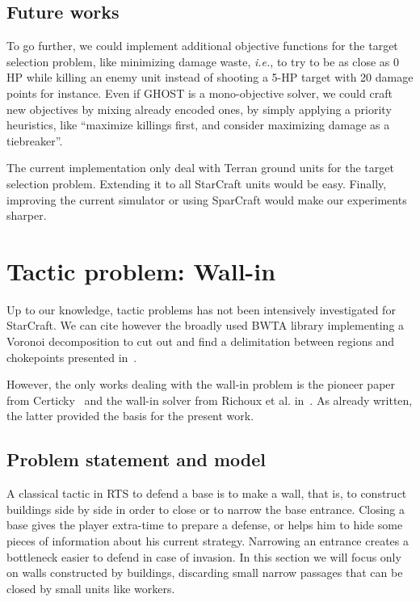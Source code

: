 \documentclass[journal]{IEEEtran}
\newcommand{\ghost}{\textsc{GHOST}\xspace}
\newcommand{\ie}{\textit{i.e.}}
\begin{document}
\subsection{Future works}

To go further,  we could implement additional  objective functions for
the target  selection problem, like  minimizing damage waste,  \ie, to
try to  be as close  as 0  HP while killing  an enemy unit  instead of
shooting a  5-HP target with 20  damage points for instance.   Even if
\ghost is  a mono-objective solver,  we could craft new  objectives by
mixing already encoded ones, by simply applying a priority heuristics,
like ``maximize  killings first, and  consider maximizing damage  as a
tiebreaker''.

The current implementation only deal  with Terran ground units for the
target selection problem.   Extending it to all  StarCraft units would
be easy. Finally,  improving the current simulator  or using SparCraft
would make our experiments sharper.

\section{Tactic problem: Wall-in}\label{sec:wall}

Up  to  our  knowledge,  tactic  problems  has  not  been  intensively
investigated for StarCraft.  We can cite however the broadly used BWTA
library implementing  a Voronoi  decomposition to cut  out and  find a
delimitation    between    regions     and    chokepoints    presented
in~\cite{Perkins10}.

However,  the only  works  dealing  with the  wall-in  problem is  the
pioneer paper  from Certicky~\cite{Certicky13} and the  wall-in solver
from Richoux  et al.   in~\cite{RichouxUO14}. As already  written, the
latter provided the basis for the present work.

\subsection{Problem statement and model}

A classical tactic in RTS to defend a base is to make a wall, that is,
to construct buildings side by side in order to close or to narrow the
base entrance. Closing a base gives the player extra-time to prepare a
defense, or  helps him to  hide some  pieces of information  about his
current strategy. Narrowing an entrance creates a bottleneck easier to
defend in  case of  invasion. In  this section we  will focus  only on
walls constructed by buildings,  discarding small narrow passages that
can be closed by small units like workers.
\end{document}
